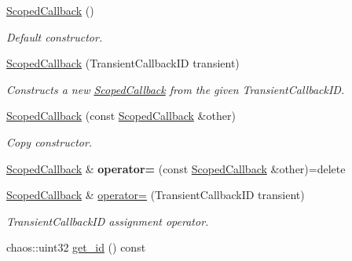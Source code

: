 \begin{DoxyCompactItemize}
\item 
\hyperlink{classsigma_1_1core_1_1_scoped_callback_ab7d6ecc53f4f2ae5c099aa432ca5fe46}{Scoped\-Callback} ()
\begin{DoxyCompactList}\small\item\em Default constructor. \end{DoxyCompactList}\item 
\hyperlink{classsigma_1_1core_1_1_scoped_callback_aa6b342b546577026badad33e7bf521b9}{Scoped\-Callback} (Transient\-Callback\-I\-D transient)
\begin{DoxyCompactList}\small\item\em Constructs a new \hyperlink{classsigma_1_1core_1_1_scoped_callback}{Scoped\-Callback} from the given Transient\-Callback\-I\-D. \end{DoxyCompactList}\item 
\hyperlink{classsigma_1_1core_1_1_scoped_callback_ae39d91862f76b1804acc8edae410678e}{Scoped\-Callback} (const \hyperlink{classsigma_1_1core_1_1_scoped_callback}{Scoped\-Callback} \&other)
\begin{DoxyCompactList}\small\item\em Copy constructor. \end{DoxyCompactList}\item 
\hypertarget{classsigma_1_1core_1_1_scoped_callback_ab0eabc2e0c158643758501f9c6bc444c}{\hyperlink{classsigma_1_1core_1_1_scoped_callback}{Scoped\-Callback} \& {\bfseries operator=} (const \hyperlink{classsigma_1_1core_1_1_scoped_callback}{Scoped\-Callback} \&other)=delete}\label{classsigma_1_1core_1_1_scoped_callback_ab0eabc2e0c158643758501f9c6bc444c}

\item 
\hyperlink{classsigma_1_1core_1_1_scoped_callback}{Scoped\-Callback} \& \hyperlink{classsigma_1_1core_1_1_scoped_callback_a482feda3a077f8c4877a4a56df7eefa3}{operator=} (Transient\-Callback\-I\-D transient)
\begin{DoxyCompactList}\small\item\em Transient\-Callback\-I\-D assignment operator. \end{DoxyCompactList}\item 
\hypertarget{classsigma_1_1core_1_1_scoped_callback_a3b4ae371184bb639999677cf66440461}{chaos\-::uint32 \hyperlink{classsigma_1_1core_1_1_scoped_callback_a3b4ae371184bb639999677cf66440461}{get\-\_\-id} () const }\label{classsigma_1_1core_1_1_scoped_callback_a3b4ae371184bb639999677cf66440461}


\end{DoxyCompactItemize}
